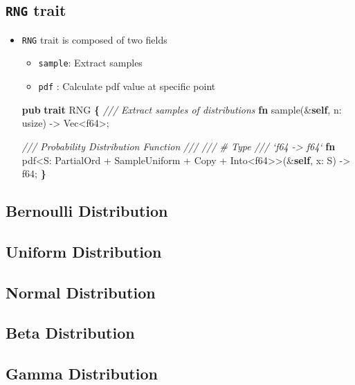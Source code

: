 \documentclass[]{book}
\newenvironment{Shaded}{\begin{snugshade}}{\end{snugshade}}
\newcommand{\BuiltInTok}[1]{#1}
\newcommand{\CommentTok}[1]{\textcolor[rgb]{0.56,0.35,0.01}{\textit{#1}}}
\newcommand{\DataTypeTok}[1]{\textcolor[rgb]{0.13,0.29,0.53}{#1}}
\newcommand{\KeywordTok}[1]{\textcolor[rgb]{0.13,0.29,0.53}{\textbf{#1}}}
\newcommand{\NormalTok}[1]{#1}
\newcommand{\OperatorTok}[1]{\textcolor[rgb]{0.81,0.36,0.00}{\textbf{#1}}}
\providecommand{\tightlist}{%
  \setlength{\itemsep}{0pt}\setlength{\parskip}{0pt}}
\begin{document}
\hypertarget{rng-trait}{%
\subsection{\texorpdfstring{\texttt{RNG} trait}{RNG trait}}\label{rng-trait}}

\begin{itemize}
\tightlist
\item
  \texttt{RNG} trait is composed of two fields

  \begin{itemize}
  \tightlist
  \item
    \texttt{sample}: Extract samples
  \item
    \texttt{pdf} : Calculate pdf value at specific point
  \end{itemize}

\begin{Shaded}
\begin{Highlighting}[]
\KeywordTok{pub} \KeywordTok{trait}\NormalTok{ RNG }\OperatorTok{\{}
    \CommentTok{/// Extract samples of distributions}
    \KeywordTok{fn}\NormalTok{ sample(&}\KeywordTok{self}\NormalTok{, n: }\DataTypeTok{usize}\NormalTok{) -> }\DataTypeTok{Vec}\NormalTok{<}\DataTypeTok{f64}\NormalTok{>;}

    \CommentTok{/// Probability Distribution Function}
    \CommentTok{///}
    \CommentTok{/// # Type}
    \CommentTok{/// `f64 -> f64`}
    \KeywordTok{fn}\NormalTok{ pdf<S: }\BuiltInTok{PartialOrd}\NormalTok{ + SampleUniform + }\BuiltInTok{Copy}\NormalTok{ + }\BuiltInTok{Into}\NormalTok{<}\DataTypeTok{f64}\NormalTok{>>(&}\KeywordTok{self}\NormalTok{, x: S) -> }\DataTypeTok{f64}\NormalTok{;}
\OperatorTok{\}}
\end{Highlighting}
\end{Shaded}
\end{itemize}

\hypertarget{bernoulli-distribution}{%
\subsection{Bernoulli Distribution}\label{bernoulli-distribution}}

\hypertarget{uniform-distribution}{%
\subsection{Uniform Distribution}\label{uniform-distribution}}

\hypertarget{normal-distribution}{%
\subsection{Normal Distribution}\label{normal-distribution}}

\hypertarget{beta-distribution}{%
\subsection{Beta Distribution}\label{beta-distribution}}

\hypertarget{gamma-distribution}{%
\subsection{Gamma Distribution}\label{gamma-distribution}}


\end{document}
